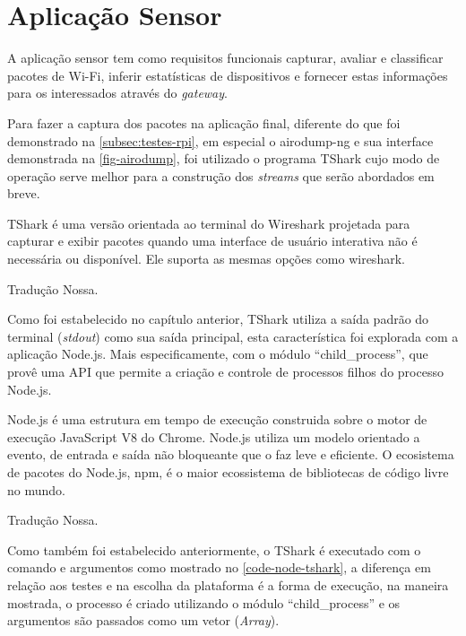 \section{Aplicação Sensor}
\label{sec:app-sensor}

A aplicação sensor tem como requisitos funcionais capturar, avaliar e
classificar pacotes de Wi-Fi, inferir estatísticas de dispositivos e fornecer
estas informações para os interessados através do \emph{gateway}.

Para fazer a captura dos pacotes na aplicação final, diferente do que foi
demonstrado na \autoref{subsec:testes-rpi}, em especial o airodump-ng e sua
interface demonstrada na \autoref{fig-airodump}, foi utilizado o programa TShark
cujo modo de operação serve melhor para a construção dos \emph{streams} que
serão abordados em breve.

\begin{citacao}

	TShark é uma versão orientada ao terminal do Wireshark projetada para
	capturar e exibir pacotes quando uma interface de usuário interativa não é
	necessária ou disponível. Ele suporta as mesmas opções como wireshark. \

	 Tradução Nossa.
\end{citacao}

Como foi estabelecido no capítulo anterior, TShark utiliza a saída padrão do
terminal (\emph{stdout}) como sua saída principal, esta característica foi
explorada com a aplicação Node.js. Mais especificamente, com o módulo
``child\_process'', que provê uma API que permite a criação e controle de
processos filhos do processo Node.js.

\begin{citacao}

	Node.js é uma estrutura em tempo de execução construida sobre o motor de
	execução JavaScript V8 do Chrome. Node.js utiliza um modelo orientado a
	evento, de entrada e saída não bloqueante que o faz leve e eficiente. O
	ecosistema de pacotes do Node.js, npm, é o maior ecossistema de bibliotecas
	de código livre no mundo. \

	 Tradução Nossa.
\end{citacao}

Como também foi estabelecido anteriormente, o TShark é executado com o comando e
argumentos como mostrado no \autoref{code-node-tshark}, a diferença em relação
aos testes e na escolha da plataforma é a forma de execução, na maneira
mostrada, o processo é criado utilizando o módulo ``child\_process''
\cite{child_process} e os argumentos são passados como um vetor (\emph{Array}).

